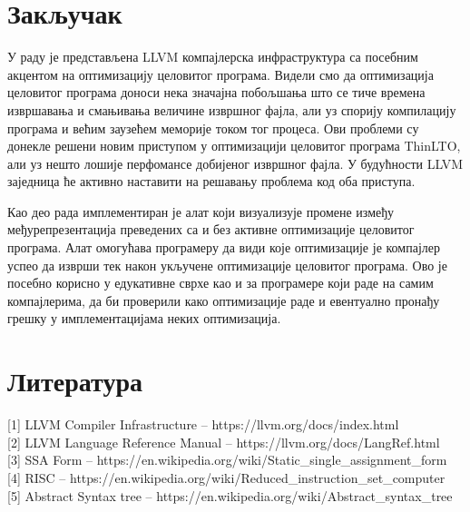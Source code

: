 \documentclass[12pt,oneside]{memoir}
\begin{document}
\chapter{Закључак}
У раду је представљена LLVM компајлерска инфраструктура са посебним акцентом
на оптимизацију целовитог програма.
Видели смо да оптимизација целовитог програма доноси нека значајна побољшања
што се тиче времена извршавања и смањивања величине извршног фајла, али уз спорију
компилацију програма и већим заузећем меморије током тог процеса.
Ови проблеми су донекле решени новим приступом у оптимизацији целовитог програма
ThinLTO, али уз нешто лошије перфомансе добијеног извршног фајла.
У будућности LLVM заједница ће активно наставити на решавању проблема код 
оба приступа.
\par
Као део рада имплементиран је алат који визуализује промене између
међурепрезентација преведених са и без активне оптимизације целовитог програма.
Алат омогућава програмеру да види које оптимизације је компајлер успео да изврши
тек након укључене оптимизације целовитог програма.
Ово је посебно корисно у едукативне сврхе као и за програмере који раде на самим
компајлерима, да би проверили како оптимизације раде и евентуално пронађу грешку
у имплементацијама неких оптимизација.



\backmatter
\chapter{Литература}
[1] LLVM Compiler Infrastructure -- https://llvm.org/docs/index.html \\

[2] LLVM Language Reference Manual -- https://llvm.org/docs/LangRef.html \\

[3] SSA Form -- https://en.wikipedia.org/wiki/Static{\_}single{\_}assignment{\_}form \\
 
[4] RISC -- https://en.wikipedia.org/wiki/Reduced{\_}instruction{\_}set{\_}computer \\

[5] Abstract Syntax tree -- https://en.wikipedia.org/wiki/Abstract{\_}syntax{\_}tree \\
\end{document}
